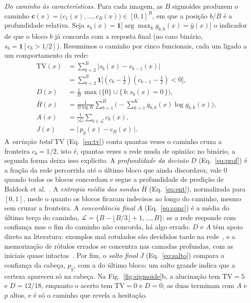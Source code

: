 \documentclass[conference,a4paper]{IEEEtran}
\begin{document}
\textit{Do caminho às características.}
Para cada imagem, as $B$ sigmoides produzem o caminho $\mathbf{c}(x) = \big(c_1(x), \dots, c_B(x)\big) \in [0,1]^B$, em que a posição
$b/B$ é a profundidade relativa. Seja $s_b(x) = \mathbf{1}\big[\arg\max_k g_{b,k}(x) = \hat y(x)\big]$ o indicador de que o bloco $b$ já
concorda com a resposta final (no caso binário, $s_b = \mathbf{1}[c_b > 1/2]$). Resumimos o caminho por cinco funcionais, cada um ligado
a um comportamento da rede:
\begin{align}
  \mathrm{TV}(x) &= \sum_{b=2}^{B} \big| s_b(x) - s_{b-1}(x) \big| \nonumber\\
     &= \sum_{b=2}^{B} \mathbf{1}\big[(c_b - \tfrac12)(c_{b-1} - \tfrac12) < 0\big], \label{eq:tv}\\
  D(x) &= \frac{1}{B}\,\max\big(\{0\} \cup \{\, b : s_b(x) = 0 \,\}\big), \label{eq:prof}\\
  \bar H(x) &= \frac{1}{B\log K} \sum_{b=1}^{B} \Big( -\sum_{k=1}^{K} g_{b,k}(x)\log g_{b,k}(x) \Big), \label{eq:ent}\\
  A(x) &= \frac{1}{|\mathcal{L}|} \sum_{b \in \mathcal{L}} c_b(x), \label{eq:conc}\\
  J(x) &= \big|\, p_{\hat y}(x) - c_B(x) \,\big|. \label{eq:salto}
\end{align}
A \emph{variação total} $\mathrm{TV}$ (Eq.~\ref{eq:tv}) conta quantas vezes o caminho cruza a fronteira $c_b = 1/2$, isto é, quantas vezes
a rede muda de opinião; no binário, a segunda forma deixa isso explícito. A \emph{profundidade da decisão} $D$ (Eq.~\ref{eq:prof}) é a
fração da rede percorrida até o último bloco que ainda discordava; vale 0 quando todos os blocos concordam e segue a profundidade de
predição de Baldock et al.~\cite{baldock2021}. A \emph{entropia média das sondas} $\bar H$ (Eq.~\ref{eq:ent}), normalizada para $[0,1]$,
mede o quanto os blocos ficaram indecisos ao longo do caminho, mesmo sem cruzar a fronteira. A \emph{concordância final} $A$
(Eq.~\ref{eq:conc}) é a média do último terço do caminho, $\mathcal{L} = \{B - \lfloor B/3 \rfloor + 1, \dots, B\}$: se a rede responde com confiança mas o fim do caminho não concorda, há algo
errado. $D$ e $A$ têm apoio direto na literatura: exemplos mal rotulados são decididos tarde na rede~\cite{baldock2021}, e a
memorização de rótulos errados se concentra nas camadas profundas, com as iniciais quase intactas~\cite{stephenson2021}. Por fim, o \emph{salto final} $J$ (Eq.~\ref{eq:salto}) compara a confiança da cabeça, $p_{\hat y}$, com a do último bloco; um salto
grande indica que a certeza apareceu só na cabeça. Na Fig.~\ref{fig:sigmoide}b, a alucinação tem $\mathrm{TV}=5$ e $D=12/18$, enquanto o acerto tem
$\mathrm{TV}=0$ e $D=0$; as duas terminam com $A$ e $p$ altos, e é só o caminho que revela a hesitação.
\end{document}
